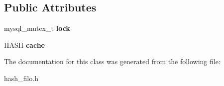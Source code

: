 \subsection*{Public Attributes}
\begin{DoxyCompactItemize}
\item 
\mbox{\label{classhash__filo_a9c86df5b92e647ea2ece4d0765f02a0c}} 
mysql\+\_\+mutex\+\_\+t {\bfseries lock}
\item 
\mbox{\label{classhash__filo_aeaeb9d3e6ddaa7ab6ed84d1808b4c062}} 
H\+A\+SH {\bfseries cache}
\end{DoxyCompactItemize}


The documentation for this class was generated from the following file\+:\begin{DoxyCompactItemize}
\item 
hash\+\_\+filo.\+h\end{DoxyCompactItemize}
